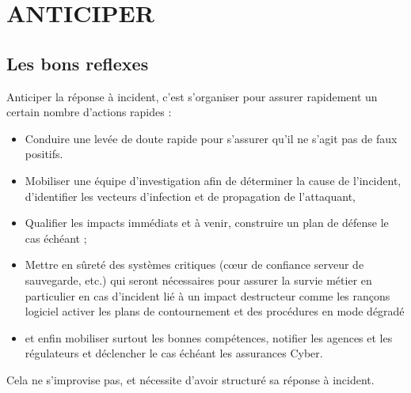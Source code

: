 %
%




\section{ANTICIPER}

\subsection{Les bons reflexes}

Anticiper la réponse à incident, c'est s'organiser pour assurer rapidement un certain nombre d'actions rapides :

\begin{itemize}
  \item Conduire une levée de doute rapide pour s'assurer qu'il ne s'agit pas de faux positifs.   \item Mobiliser une équipe d'investigation afin de déterminer la cause de l'incident, d'identifier les vecteurs d'infection et de propagation de l'attaquant,
  \item Qualifier les impacts immédiats et à venir, construire un plan de défense le cas échéant ;
  \item Mettre en sûreté des systèmes critiques (cœur de confiance serveur de sauvegarde, etc.) qui seront nécessaires pour assurer la survie métier en particulier en cas d'incident lié à un impact destructeur comme les rançons logiciel activer les plans de contournement et des procédures en mode dégradé 
  \item et enfin mobiliser surtout les bonnes compétences, notifier les agences et les régulateurs et déclencher le cas échéant les assurances Cyber.
\end{itemize}

Cela ne s'improvise pas, et nécessite d'avoir structuré sa réponse à incident.

